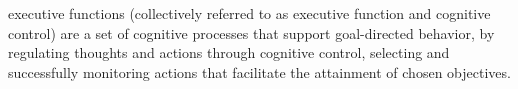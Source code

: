 \documentclass[a4paper]{article}
\title{}
\date{}
\begin{document}
\maketitle
    executive functions (collectively referred to as executive function and cognitive control) are a set of cognitive processes that support goal-directed behavior, by regulating thoughts and actions through cognitive control, selecting and successfully monitoring actions that facilitate the attainment of chosen objectives.
\end{document}
